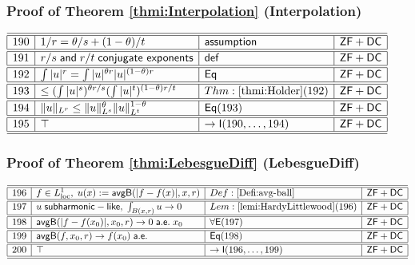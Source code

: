 \documentclass[11pt,reqno]{amsart}
\begin{document}
\medskip

\subsubsection*{Proof of Theorem \ref{thmi:Interpolation} (\textsf{Interpolation})}

\noindent$%
\begin{array}{|r|l|l|l|}
\hline\hline
190 & 1/r=\theta/s+(1-\theta)/t & \mathsf{assumption} & \mathsf{ZF+DC} \\ \hline\hline
191 & r/s\;\mathsf{and}\;r/t\;\mathsf{conjugate\ exponents} & \mathsf{def} & \mathsf{ZF+DC} \\ \hline\hline
192 & \int|u|^{r}=\int|u|^{\theta r}|u|^{(1-\theta)r} & \mathsf{Eq} & \mathsf{ZF+DC} \\ \hline\hline
193 & \le(\int|u|^{s})^{\theta r/s}(\int|u|^{t})^{(1-\theta)r/t} & Thm:\ref{thmi:Holder}(192) & \mathsf{ZF+DC} \\ \hline\hline
194 & \|u\|_{L^{r}}\le\|u\|_{L^{s}}^{\theta}\|u\|_{L^{t}}^{1-\theta} & \mathsf{Eq}(193) & \mathsf{ZF+DC} \\ \hline\hline
195 & \top & \to\mathsf{I}(190,\dots,194) & \mathsf{ZF+DC} \\ \hline\hline
\end{array}%
$

\medskip

\subsubsection*{Proof of Theorem \ref{thmi:LebesgueDiff} (\textsf{LebesgueDiff})}

\noindent$%
\begin{array}{|r|l|l|l|}
\hline\hline
196 & f\in L^{1}_{\mathrm{loc}},\;u(x):=\mathsf{avgB}(|f-f(x)|,x,r) & Def:\ref{Defi:avg-ball} & \mathsf{ZF+DC} \\ \hline\hline
197 & u\;\mathsf{subharmonic-like},\;\int_{B(x,r)}u\to0 & Lem:\ref{lemi:HardyLittlewood}(196) & \mathsf{ZF+DC} \\ \hline\hline
198 & \mathsf{avgB}(|f-f(x_{0})|,x_{0},r)\to0\;\mathsf{a.e.}\;x_{0} & \forall\mathsf{E}(197) & \mathsf{ZF+DC} \\ \hline\hline
199 & \mathsf{avgB}(f,x_{0},r)\to f(x_{0})\;\mathsf{a.e.} & \mathsf{Eq}(198) & \mathsf{ZF+DC} \\ \hline\hline
200 & \top & \to\mathsf{I}(196,\dots,199) & \mathsf{ZF+DC} \\ \hline\hline
\end{array}%
$
\end{document}
